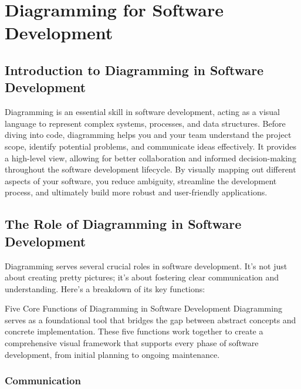 \chapter{Diagramming for Software Development}

\section{Introduction to Diagramming in Software Development}

Diagramming is an essential skill in software development, acting as a visual language to represent complex systems, processes, and data structures. Before diving into code, diagramming helps you and your team understand the project scope, identify potential problems, and communicate ideas effectively. It provides a high-level view, allowing for better collaboration and informed decision-making throughout the software development lifecycle. By visually mapping out different aspects of your software, you reduce ambiguity, streamline the development process, and ultimately build more robust and user-friendly applications.


\section{The Role of Diagramming in Software Development}

Diagramming serves several crucial roles in software development. It's not just about creating pretty pictures; it's about fostering clear communication and understanding. Here's a breakdown of its key functions:

\begin{conceptcard}{Five Core Functions of Diagramming in Software Development}
  Diagramming serves as a foundational tool that bridges the gap between abstract concepts and concrete implementation. These five functions work together to create a comprehensive visual framework that supports every phase of software development, from initial planning to ongoing maintenance.
\end{conceptcard}

\subsection{Communication}

